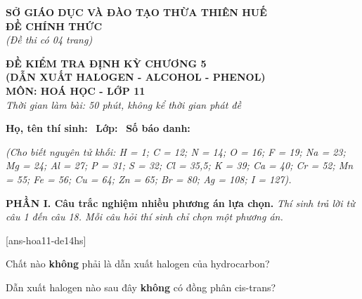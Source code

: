 \documentclass[12pt,a4paper]{article}
\begin{document}
\thispagestyle{firstpage}

\noindent
\begin{minipage}[t]{0.44\textwidth}
	\centering\fontsize{10pt}{12pt}\selectfont
	\textbf{SỞ GIÁO DỤC VÀ ĐÀO TẠO THỪA THIÊN HUẾ}\\
	\textbf{ĐỀ CHÍNH THỨC}\\
	\textit{(Đề thi có 04 trang)}
\end{minipage}\hfill
\begin{minipage}[t]{0.54\textwidth}
	\centering\fontsize{10.5pt}{13pt}\selectfont
	\textbf{ĐỀ KIỂM TRA ĐỊNH KỲ CHƯƠNG 5}\\
	\textbf{(DẪN XUẤT HALOGEN - ALCOHOL - PHENOL)}\\
	\textbf{MÔN: HOÁ HỌC - LỚP 11}\\
	\textit{Thời gian làm bài: 50 phút, không kể thời gian phát đề}
	
	\smallskip
\end{minipage}

\smallskip
\noindent\hrulefill
\smallskip

\noindent\textbf{Họ, tên thí sinh:} \dotfill\ \textbf{Lớp:} \dotfill\ \textbf{Số báo danh:} \dotfill

\smallskip
\noindent\textit{(Cho biết nguyên tử khối: H = 1; C = 12; N = 14; O = 16; F = 19; Na = 23; Mg = 24; Al = 27; P = 31; S = 32; Cl = 35,5; K = 39; Ca = 40; Cr = 52; Mn = 55; Fe = 56; Cu = 64; Zn = 65; Br = 80; Ag = 108; I = 127).}
\smallskip

\noindent\textbf{\large PHẦN I. Câu trắc nghiệm nhiều phương án lựa chọn.}
\textit{Thí sinh trả lời từ câu 1 đến câu 18. Mỗi câu hỏi thí sinh chỉ chọn một phương án.}
\vspace{0.2cm}

[ans-hoa11-de14hs]

\begin{ex}
Chất nào \textbf{không} phải là dẫn xuất halogen của hydrocarbon?
\choice
{}
{}
{\True {}}
{}
\end{ex}

\begin{ex}
Dẫn xuất halogen nào sau đây \textbf{không} có đồng phân cis-trans?
\choice
{}
{\True {}}
{}
{}
\end{ex}
\end{document}
